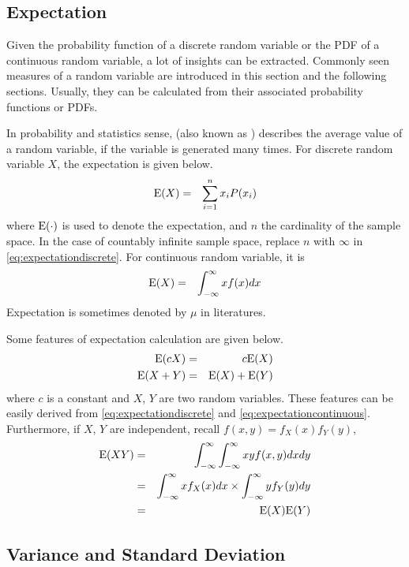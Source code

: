 \subsection{Expectation}

Given the probability function of a discrete random variable or the PDF of a continuous random variable, a lot of insights can be extracted. Commonly seen measures of a random variable are introduced in this section and the following sections. Usually, they can be calculated from their associated probability functions or PDFs.

In probability and statistics sense,  (also known as ) describes the average value of a random variable, if the variable is generated many times. For discrete random variable $X$, the expectation is given below.
\begin{eqnarray}
	\textup{E}(X) &=& \sum_{i=1}^{n}x_iP(x_i) \label{eq:expectationdiscrete}
\end{eqnarray}
where $\textup{E}(\cdot)$ is used to denote the expectation, and $n$ the cardinality of the sample space. In the case of countably infinite sample space, replace $n$ with $\infty$ in \eqref{eq:expectationdiscrete}. For continuous random variable, it is
\begin{eqnarray}
	\textup{E}(X) &=& \int_{-\infty}^{\infty}xf(x)dx \label{eq:expectationcontinuous}
\end{eqnarray}
Expectation is sometimes denoted by $\mu$ in literatures.

Some features of expectation calculation are given below.
\begin{eqnarray}
	\textup{E}(cX) &=& c\textup{E}(X) \nonumber \\
	\textup{E}(X+Y) &=& \textup{E}(X) + \textup{E}(Y) \nonumber
\end{eqnarray}
where $c$ is a constant and $X$, $Y$ are two random variables. These features can be easily derived from \eqref{eq:expectationdiscrete} and \eqref{eq:expectationcontinuous}. Furthermore, if $X$, $Y$ are independent, recall $f(x,y) = f_X(x)f_Y(y)$,
\begin{eqnarray}
	\textup{E}(XY) &=& \int_{-\infty}^{\infty}\int_{-\infty}^{\infty} xyf(x, y)dxdy \nonumber \\
	&=& \int_{-\infty}^{\infty}xf_X(x)dx \times \int_{-\infty}^{\infty}yf_Y(y)dy \nonumber \\
	&=& \textup{E}(X)\textup{E}(Y) \nonumber
\end{eqnarray}

\subsection{Variance and Standard Deviation}

